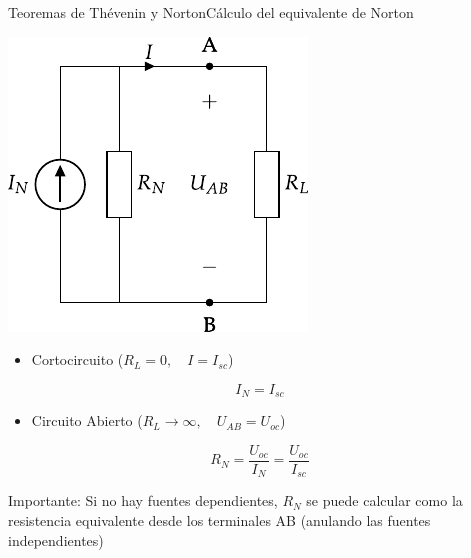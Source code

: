 \documentclass[aspectratio=169, xcolor={usenames,svgnames,dvipsnames}]{beamer}
\begin{document}
\begin{frame}{Teoremas de Thévenin y Norton}{Cálculo del equivalente de Norton}
\begin{minipage}[c]{0.4\linewidth}
\begin{center}
\includegraphics[width=.9\linewidth]{../figs/norton_continua.pdf}
\end{center}
\end{minipage}
\hfill
\begin{minipage}[c]{0.58\linewidth}
\begin{itemize}
\item Cortocircuito (\(R_L = 0, \quad I = I_{sc}\))
\end{itemize}
\[
\boxed{I_N = I_{sc}}
\]
\begin{itemize}
\item Circuito Abierto (\(R_L \to \infty, \quad U_{AB} = U_{oc}\))
\end{itemize}
\[
\boxed{R_N = \frac{U_{oc}}{I_N} = \frac{U_{oc}}{I_{sc}}}
\]
\end{minipage}

\vspace{5mm}
\alert{Importante:} Si no hay fuentes dependientes, $R_{N}$ se puede calcular como la \alert{resistencia} equivalente desde los terminales AB (anulando las fuentes independientes)
\end{frame}
\end{document}
